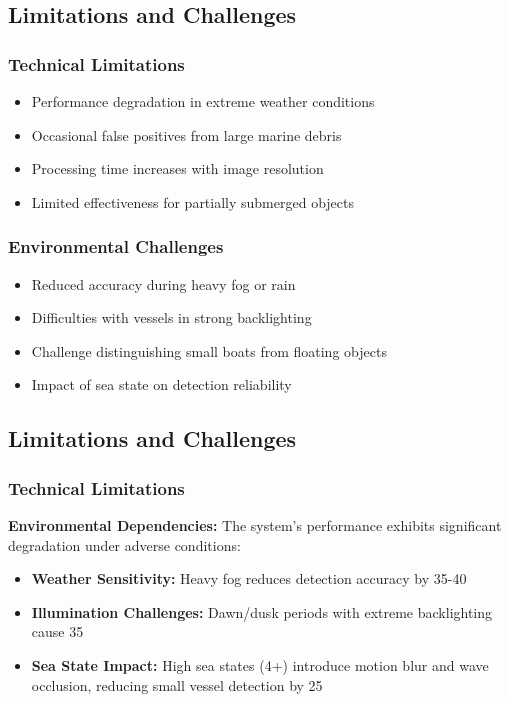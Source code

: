\documentclass[a4paper,11pt]{article}
\begin{document}
\subsection{Limitations and Challenges}

\subsubsection{Technical Limitations}
\begin{itemize}
    \item Performance degradation in extreme weather conditions
    \item Occasional false positives from large marine debris
    \item Processing time increases with image resolution
    \item Limited effectiveness for partially submerged objects
\end{itemize}

\subsubsection{Environmental Challenges}
\begin{itemize}
    \item Reduced accuracy during heavy fog or rain
    \item Difficulties with vessels in strong backlighting
    \item Challenge distinguishing small boats from floating objects
    \item Impact of sea state on detection reliability
\end{itemize}

\subsection{Limitations and Challenges}

\subsubsection{Technical Limitations}

\textbf{Environmental Dependencies:}
The system's performance exhibits significant degradation under adverse conditions:
\begin{itemize}
    \item \textbf{Weather Sensitivity:} Heavy fog reduces detection accuracy by 35-40%
    \item \textbf{Illumination Challenges:} Dawn/dusk periods with extreme backlighting cause 35%
    \item \textbf{Sea State Impact:} High sea states (4+) introduce motion blur and wave occlusion, reducing small vessel detection by 25%
\end{itemize}
\end{document}
